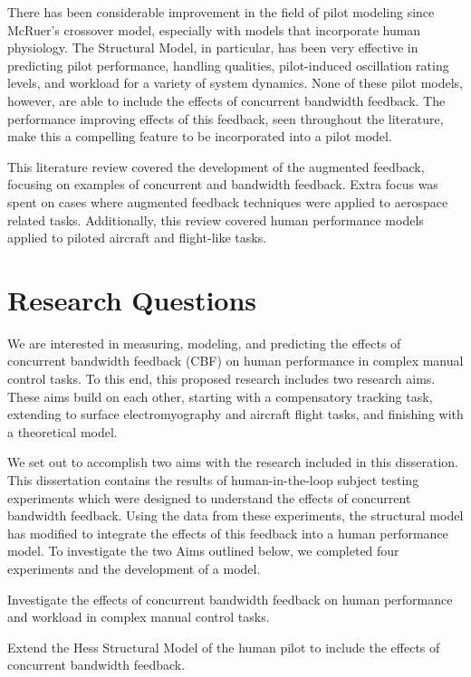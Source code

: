 There has been considerable improvement in the field of pilot modeling since McRuer's crossover model, especially with models that incorporate human physiology.
The Structural Model, in particular, has been very effective in predicting pilot performance, handling qualities, pilot-induced oscillation rating levels, and workload for a variety of system dynamics.
None of these pilot models, however, are able to include the effects of concurrent bandwidth feedback.
The performance improving effects of this feedback, seen throughout the literature, make this a compelling feature to be incorporated into a pilot model.

This literature review covered the development of the augmented feedback, focusing on examples of concurrent and bandwidth feedback.
Extra focus was spent on cases where augmented feedback techniques were applied to aerospace related tasks.
Additionally, this review covered human performance models applied to piloted aircraft and flight-like tasks.

\section{Research Questions}
\label{sec:intro_questions}
We are interested in measuring, modeling, and predicting the effects of concurrent bandwidth feedback (CBF) on human performance in complex manual control tasks.
To this end, this proposed research includes two research aims.
These aims build on each other, starting with a compensatory tracking task, extending to surface electromyography and aircraft flight tasks, and finishing with a theoretical model.

We set out to accomplish two aims with the research included in this disseration.
This dissertation contains the results of human-in-the-loop subject testing experiments which were designed to understand the effects of concurrent bandwidth feedback.
Using the data from these experiments, the structural model has modified to integrate the effects of this feedback into a human performance model.
To investigate the two Aims outlined below, we completed four experiments and the development of a model.

\begin{description}[align=left]
    \item [Aim One] Investigate the effects of concurrent bandwidth feedback on human performance and workload in complex manual control tasks.
    \item [Aim Two] Extend the Hess Structural Model of the human pilot to include the effects of concurrent bandwidth feedback.
\end{description}

